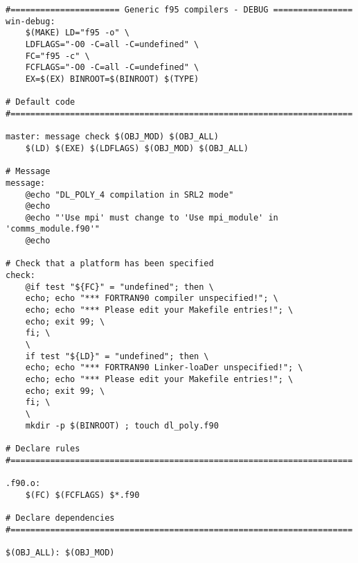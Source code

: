 \begin{verbatim}
#====================== Generic f95 compilers - DEBUG ================
win-debug:
	$(MAKE) LD="f95 -o" \
	LDFLAGS="-O0 -C=all -C=undefined" \
	FC="f95 -c" \
	FCFLAGS="-O0 -C=all -C=undefined" \
	EX=$(EX) BINROOT=$(BINROOT) $(TYPE)

# Default code
#=====================================================================

master: message check $(OBJ_MOD) $(OBJ_ALL)
	$(LD) $(EXE) $(LDFLAGS) $(OBJ_MOD) $(OBJ_ALL)

# Message
message:
	@echo "DL_POLY_4 compilation in SRL2 mode"
	@echo
	@echo "'Use mpi' must change to 'Use mpi_module' in 'comms_module.f90'"
	@echo

# Check that a platform has been specified
check:
	@if test "${FC}" = "undefined"; then \
	echo; echo "*** FORTRAN90 compiler unspecified!"; \
	echo; echo "*** Please edit your Makefile entries!"; \
	echo; exit 99; \
	fi; \
	\
	if test "${LD}" = "undefined"; then \
	echo; echo "*** FORTRAN90 Linker-loaDer unspecified!"; \
	echo; echo "*** Please edit your Makefile entries!"; \
	echo; exit 99; \
	fi; \
	\
	mkdir -p $(BINROOT) ; touch dl_poly.f90

# Declare rules
#=====================================================================

.f90.o:
	$(FC) $(FCFLAGS) $*.f90

# Declare dependencies
#=====================================================================

$(OBJ_ALL): $(OBJ_MOD)
\end{verbatim}
